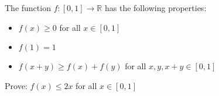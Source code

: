 The function $f\colon[0,1]\rightarrow\mathbb{R}$ has the following properties:
\begin{itemize}
    \item $f(x) \geq 0$ for all $x \in [0,1]$
    \item $f(1) = 1$
    \item $f(x+y) \geq f(x)+f(y)$ for all $x, y, x+y \in [0,1]$
\end{itemize}
Prove: $f(x)\leq 2x$ for all $x \in [0,1]$
